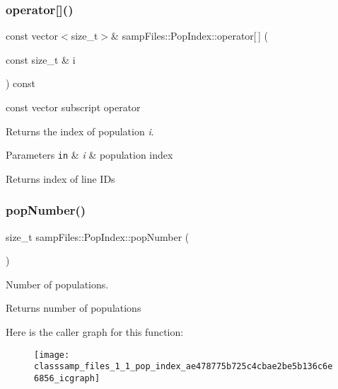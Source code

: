 \subsubsection{\texorpdfstring{operator[]()}{operator[]()}\hspace{0.1cm}{\footnotesize\ttfamily [2/2]}}
{\footnotesize\ttfamily const vector$<$size\+\_\+t$>$\& samp\+Files\+::\+Pop\+Index\+::operator\mbox{[}$\,$\mbox{]} (\begin{DoxyParamCaption}\item[{const size\+\_\+t \&}]{i }\end{DoxyParamCaption}) const\hspace{0.3cm}{\ttfamily [inline]}}



{\ttfamily const} vector subscript operator 

Returns the index of population {\itshape i}.


\begin{DoxyParams}[1]{Parameters}
\mbox{\tt in}  & {\em i} & population index \\
\hline
\end{DoxyParams}
\begin{DoxyReturn}{Returns}
index of line I\+Ds 
\end{DoxyReturn}
\mbox{\label{classsamp_files_1_1_pop_index_ae478775b725c4cbae2be5b136c6e6856}} 
\subsubsection{\texorpdfstring{pop\+Number()}{popNumber()}\hspace{0.1cm}{\footnotesize\ttfamily [1/2]}}
{\footnotesize\ttfamily size\+\_\+t samp\+Files\+::\+Pop\+Index\+::pop\+Number (\begin{DoxyParamCaption}{ }\end{DoxyParamCaption})\hspace{0.3cm}{\ttfamily [inline]}}



Number of populations. 

\begin{DoxyReturn}{Returns}
number of populations 
\end{DoxyReturn}
Here is the caller graph for this function\+:\nopagebreak
\begin{figure}[H]
\begin{center}
\leavevmode
\texttt{[image: classsamp\_files\_1\_1\_pop\_index\_ae478775b725c4cbae2be5b136c6e6856\_icgraph]}
\end{center}
\end{figure}
\mbox{\label{classsamp_files_1_1_pop_index_a6dde50396274681751d41b058af376d7}} 
